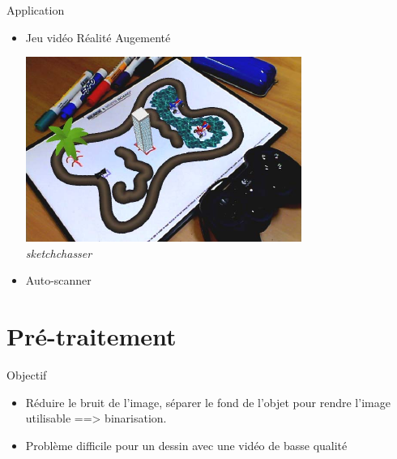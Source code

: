 \documentclass[t,14pt]{beamer}
\begin{document}
\begin{frame}{Application }
\vspace{2mm}
\begin{itemize}
\item Jeu vidéo Réalité Augementé

\begin{center}
\includegraphics[scale=0.5]{images/sketchchasser.png}
\textit{\\sketchchasser}
\end{center}
\item Auto-scanner 
\end{itemize}
\end{frame}

\section[Pré-traitement]{Pré-traitement}
\vspace{5mm}
\begin{frame}{Objectif}
\vspace{5mm}
\begin{itemize}[<+->]
\item Réduire le bruit de l'image, séparer le fond de l'objet pour rendre l'image utilisable ==> binarisation.



\item Problème difficile pour un dessin avec une vidéo de basse qualité 





\end{itemize}
\end{frame}
\end{document}

